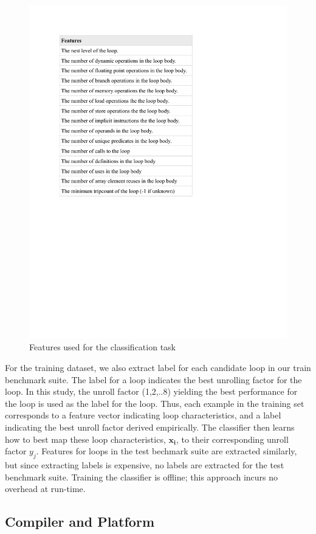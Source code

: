 \documentclass[]{sig-alternate}
\begin{document}
\begin{figure}
  \center
  \includegraphics[width=0.90\linewidth]{fig/features.pdf}
  \caption{Features used for the classification task}
  \label{fig:features}
\end{figure}

For the training dataset, we also extract label for each candidate loop in our train benchmark suite. The label for a loop indicates the best unrolling factor for the loop. In this study, the unroll factor (1,2,..8) yielding the best performance for the loop is used as the label for the loop. Thus, each example in the training set corresponds to a feature vector indicating loop characteristics, and a label indicating the best unroll factor derived empirically. The classifier then learns how to best map these loop characteristics, $\mathbf{x_i}$, to their corresponding unroll factor $y_j$. Features for loops in the test bechmark suite are extracted similarly, but since extracting labels is expensive, no labels are extracted for the test benchmark suite. Training the classifier is offline; this approach incurs no overhead at run-time. 

\subsection{Compiler and Platform}
\label{subsec:CompilerPlatform}
\end{document}
